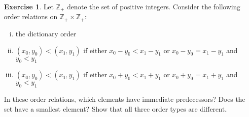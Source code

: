 \documentclass[11pt,a4paper,twoside]{article}
\theoremstyle{definition}
\newcounter{excounter}
\newtheorem{exercise}[excounter]{Exercise}
\begin{document}
\begin{exercise}

  Let $\mathbb{Z}_+$ denote the set of positive integers. Consider the following order relations on $\mathbb{Z}_+ \times \mathbb{Z}_+:$
  \begin{enumerate}[(i)]
  \item the dictionary order
  \item $(x_0, y_0) < (x_1, y_1)$ if either $x_0 - y_0 < x_1 - y_1$ or $x_0 - y_0 = x_1 - y_1$ and $y_0 < y_1$
  \item $(x_0, y_0) < (x_1, y_1)$ if either $x_0 + y_0 < x_1 + y_1$ or $x_0 + y_0 = x_1 + y_1$ and $y_0 < y_1$
  \end{enumerate}
  In these order relations, which elements have immediate predecessors? Does the set have a smallest element?
  Show that all three order types are different.

\end{exercise}
\end{document}
